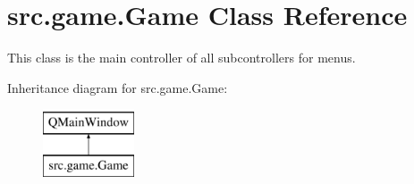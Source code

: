 \hypertarget{classsrc_1_1game_1_1_game}{}\section{src.\+game.\+Game Class Reference}
\label{classsrc_1_1game_1_1_game}


This class is the main controller of all subcontrollers for menus.  


Inheritance diagram for src.\+game.\+Game\+:\begin{figure}[H]
\begin{center}
\leavevmode
\includegraphics[height=2.000000cm]{classsrc_1_1game_1_1_game}
\end{center}
\end{figure}
